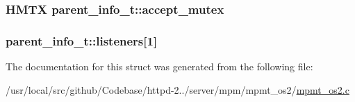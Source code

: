 \subsubsection[{\texorpdfstring{accept\+\_\+mutex}{accept_mutex}}]{\setlength{\rightskip}{0pt plus 5cm}H\+M\+TX parent\+\_\+info\+\_\+t\+::accept\+\_\+mutex}\hypertarget{structparent__info__t_ac1813ad7963113d5d0f7bbf24e3305b5}{}\label{structparent__info__t_ac1813ad7963113d5d0f7bbf24e3305b5}
\subsubsection[{\texorpdfstring{listeners}{listeners}}]{ parent\+\_\+info\+\_\+t\+::listeners\mbox{[}1\mbox{]}}\hypertarget{structparent__info__t_aaf70d8a1c2b004c8517cce0304656b88}{}\label{structparent__info__t_aaf70d8a1c2b004c8517cce0304656b88}


The documentation for this struct was generated from the following file\+:\begin{DoxyCompactItemize}
\item 
/usr/local/src/github/\+Codebase/httpd-\/2../server/mpm/mpmt\+\_\+os2/\hyperlink{mpmt__os2_8c}{mpmt\+\_\+os2.\+c}\end{DoxyCompactItemize}
